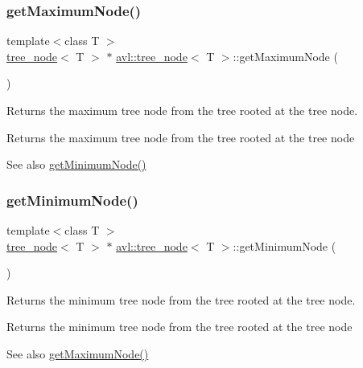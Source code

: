 \subsubsection{\texorpdfstring{get\+Maximum\+Node()}{getMaximumNode()}}
{\footnotesize\ttfamily template$<$class T $>$ \\
\hyperlink{classavl_1_1tree__node}{tree\+\_\+node}$<$ T $>$ $\ast$ \hyperlink{classavl_1_1tree__node}{avl\+::tree\+\_\+node}$<$ T $>$\+::get\+Maximum\+Node (\begin{DoxyParamCaption}{ }\end{DoxyParamCaption})}

Returns the maximum tree node from the tree rooted at the tree node. \begin{DoxyReturn}{Returns}
the maximum tree node from the tree rooted at the tree node 
\end{DoxyReturn}
\begin{DoxySeeAlso}{See also}
\hyperlink{classavl_1_1tree__node_af2a04b44c2d9abfab772dcf61143df35}{get\+Minimum\+Node()} 
\end{DoxySeeAlso}
\mbox{\label{classavl_1_1tree__node_af2a04b44c2d9abfab772dcf61143df35}} 
\subsubsection{\texorpdfstring{get\+Minimum\+Node()}{getMinimumNode()}}
{\footnotesize\ttfamily template$<$class T $>$ \\
\hyperlink{classavl_1_1tree__node}{tree\+\_\+node}$<$ T $>$ $\ast$ \hyperlink{classavl_1_1tree__node}{avl\+::tree\+\_\+node}$<$ T $>$\+::get\+Minimum\+Node (\begin{DoxyParamCaption}{ }\end{DoxyParamCaption})}

Returns the minimum tree node from the tree rooted at the tree node. \begin{DoxyReturn}{Returns}
the minimum tree node from the tree rooted at the tree node 
\end{DoxyReturn}
\begin{DoxySeeAlso}{See also}
\hyperlink{classavl_1_1tree__node_a47e9411fcd44d4ea5b8403e1ae757060}{get\+Maximum\+Node()} 
\end{DoxySeeAlso}
\mbox{\label{classavl_1_1tree__node_ae69bc500ca4e3d5d7a4ffab75edf16dc}} 
